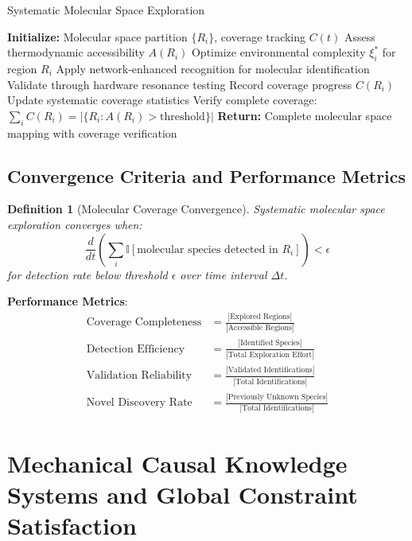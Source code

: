 \documentclass[11pt,a4paper]{article}
\newtheorem{definition}[theorem]{Definition}
\theoremstyle{remark}
\begin{document}
\begin{algorithm}
\caption{Systematic Molecular Space Exploration}
\begin{algorithmic}[1]
\State \textbf{Initialize:} Molecular space partition $\{R_i\}$, coverage tracking $C(t)$
\State Assess thermodynamic accessibility $A(R_i)$
\State Optimize environmental complexity $\xi_i^*$ for region $R_i$
\State Apply network-enhanced recognition for molecular identification
\State Validate through hardware resonance testing
\State Record coverage progress $C(R_i)$
\EndIf
\State Update systematic coverage statistics
\EndFor
\State Verify complete coverage: $\sum_i C(R_i) = |\{R_i : A(R_i) > \text{threshold}\}|$
\State \textbf{Return:} Complete molecular space mapping with coverage verification
\end{algorithmic}
\end{algorithm}

\subsection{Convergence Criteria and Performance Metrics}

\begin{definition}[Molecular Coverage Convergence]
Systematic molecular space exploration converges when:
$$\frac{d}{dt}\left(\sum_{i} \mathbb{I}[\text{molecular species detected in } R_i]\right) < \epsilon$$
for detection rate below threshold $\epsilon$ over time interval $\Delta t$.
\end{definition}

\textbf{Performance Metrics}:
\begin{align}
\text{Coverage Completeness} &= \frac{|\text{Explored Regions}|}{|\text{Accessible Regions}|}\\
\text{Detection Efficiency} &= \frac{|\text{Identified Species}|}{|\text{Total Exploration Effort}|}\\
\text{Validation Reliability} &= \frac{|\text{Validated Identifications}|}{|\text{Total Identifications}|}\\
\text{Novel Discovery Rate} &= \frac{|\text{Previously Unknown Species}|}{|\text{Total Identifications}|}
\end{align}

\section{Mechanical Causal Knowledge Systems and Global Constraint Satisfaction}
\end{document}
